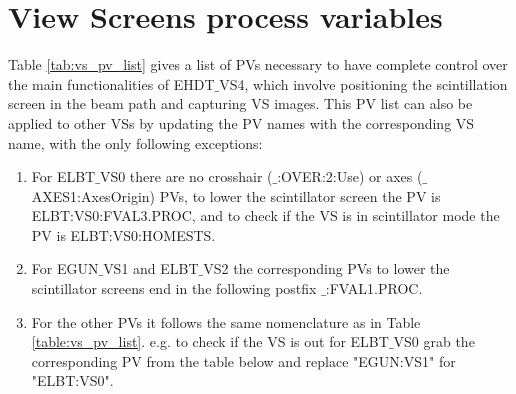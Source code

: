 \documentclass{article}
\begin{document}
\section{View Screens process variables} \label{appendix:VS_PV}
Table \ref{tab:vs_pv_list} gives a list of PVs necessary to have complete control over the main functionalities of EHDT$\_$VS4, which involve positioning the scintillation screen in the beam path and capturing VS images. This PV list can also be applied to other VSs by updating the PV names with the corresponding VS name, with the only following exceptions: 
\begin{enumerate}
        \item For ELBT$\_$VS0 there are no crosshair ($\_$:OVER:2:Use) or axes ($\_$AXES1:AxesOrigin) PVs, to lower the scintillator screen the PV is ELBT:VS0:FVAL3.PROC, and to check if the VS is in scintillator mode the PV is ELBT:VS0:HOMESTS.
        \item For EGUN$\_$VS1 and ELBT$\_$VS2 the corresponding PVs to lower the scintillator screens end in the following postfix $\_$:FVAL1.PROC.
        \item For the other PVs it follows the same nomenclature as in Table \ref{table:vs_pv_list}. e.g. to check if the VS is out for ELBT$\_$VS0 grab the corresponding PV from the table below and replace "EGUN:VS1" for "ELBT:VS0".
\end{enumerate}
\end{document}
